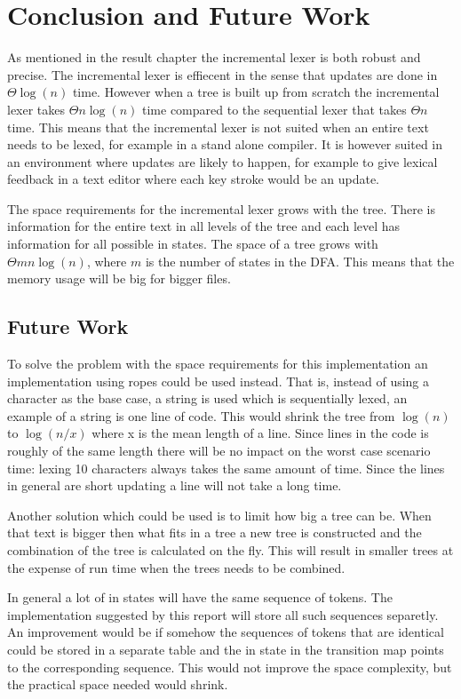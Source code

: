 \chapter{Conclusion and Future Work}
As mentioned in the result chapter the incremental lexer is both robust and
precise. The incremental lexer is effiecent in the sense that updates are done
in $\Theta \log(n)$ time. However when a tree is built up from scratch the
incremental lexer takes $\Theta n\log(n)$ time compared to the sequential lexer
that takes $\Theta n$ time. This means that the incremental lexer is not suited
when an entire text needs to be lexed, for example in a stand alone compiler. It
is however suited in an environment where updates are likely to happen, for
example to give lexical feedback in a text editor where each key stroke would be
an update.

The space requirements for the incremental lexer grows with the tree. There is
information for the entire text in all levels of the tree and each level has
information for all possible in states. The space of a tree grows with
$\Theta mn\log(n)$, where $m$ is the number of states in the DFA. This means
that the memory usage will be big for bigger files.

\section{Future Work}
To solve the problem with the space requirements for this implementation an
implementation using ropes could be used instead. That is, instead of using a
character as the base case, a string is used which is sequentially lexed, an
example of a string is one line of code. This
would shrink the tree from $\log(n)$ to $\log(n/x)$ where x is the mean length
of a line. Since lines in the code is roughly of the same length there will be
no impact on the worst case scenario time: lexing 10 characters always takes the
same amount of time. Since the lines in general are short updating a line will
not take a long time.

Another solution which could be used is to limit how big a tree can be. When
that text is bigger then what fits in a tree a new tree is constructed and the
combination of the tree is calculated on the fly. This will result in smaller
trees at the expense of run time when the trees needs to be combined.

In general a lot of in states will have the same sequence of tokens. The
implementation suggested by this report will store all such sequences separetly.
An improvement would be if somehow the sequences of tokens that are identical
could be stored in a separate table and the in state in the transition map points
to the corresponding sequence. This would not improve the space complexity, but
the practical space needed would shrink.
